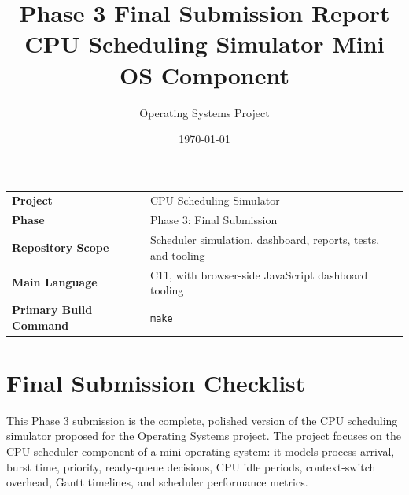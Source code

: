 \documentclass[11pt]{article}
\title{\textbf{Phase 3 Final Submission Report}\\
CPU Scheduling Simulator Mini OS Component}
\author{Operating Systems Project}
\date{\today}
\begin{document}
\maketitle

\begin{center}
\begin{tabular}{ll}
\toprule
\textbf{Project} & CPU Scheduling Simulator \\
\textbf{Phase} & Phase 3: Final Submission \\
\textbf{Repository Scope} & Scheduler simulation, dashboard, reports, tests, and tooling \\
\textbf{Main Language} & C11, with browser-side JavaScript dashboard tooling \\
\textbf{Primary Build Command} & \texttt{make} \\
\bottomrule
\end{tabular}
\end{center}

\section{Final Submission Checklist}

This Phase 3 submission is the complete, polished version of the CPU scheduling
simulator proposed for the Operating Systems project. The project focuses on the
CPU scheduler component of a mini operating system: it models process arrival,
burst time, priority, ready-queue decisions, CPU idle periods, context-switch
overhead, Gantt timelines, and scheduler performance metrics.
\end{document}
